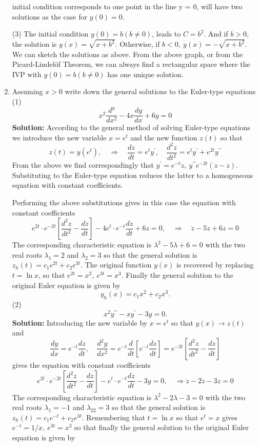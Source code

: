 \documentclass[11pt,a4paper,twoside]{article}
\begin{document}
\begin{enumerate}[\bfseries A.]
\begin{figure}[H]
		\end{figure}
		initial condition corresponds to one point in the line y = 0, will have two solutions as the case for $y(0) = 0$.\par
		(3) The initial condition $y(0) = b(b \neq 0)$, leads to $C=b^2$. And if $b>0$, the solution is $y(x) = \sqrt{x+b^2}$.  Otherwise, if $b<0,\ y(x) = -\sqrt{x+b^2}$. We can sketch the solutions as above. From the above graph, or from the Picard-Lindel\"{o}f Theorem, we can always find a rectangular space where the IVP with $y(0) = b(b \neq 0)$ has one unique solution.
		\item Assuming $x > 0$ write down the general solutions to the Euler-type equations (1)
		$$
		x^2\frac{d^y}{dx^2} - 4x\frac{dy}{dx}+6y = 0
		$$
		\textbf{Solution:} According to the general method of solving Euler-type equations we introduce the new variable $x = e^t$ and the new function $z(t)$ so that
		$$
		z(t) = y(e^t),\quad \Rightarrow \quad \frac{dz}{dt} = e^ty^\prime,\quad \frac{d^2z}{dt^2} = e^ty^\prime + e^{2t}y^{\prime\prime}
		$$
		From the above we find correspondingly that $y^\prime = e^{-t}\dot{z},\ y^{\prime\prime} e^{-2t}(\ddot{z} - \dot{z})$.  Substituting to the Euler-type equation reduces the latter to a homogeneous equation with constant coefficients.\par
		Performing the above substitutions gives in this case the equation with constant coefficients
		$$
		e^{2t}\cdot e^{-2t}\left[\frac{d^2z}{dt^2} - \frac{dz}{dt}\right]-4e^t\cdot e^{-t}\frac{dz}{dt} + 6z = 0,\quad \Rightarrow \quad \ddot{z}-5\dot{z} + 6z = 0
		$$
		The corresponding characteristic equation is $\lambda^2-5\lambda+6=0$ with the two real roots $\lambda_1 = 2$ and $\lambda_2 = 3$ so that the general solution is $z_h(t) = c_1e^{2t} + c_2e^{3t}$. The original function $y(x)$ is recovered by replacing $t = \ln x$, so that $e^{2t} = x^2,\ e^{3t} = x^3$. Finally the general solution to the original Euler equation is given by
		$$
		y_h(x) = c_1x^2 + c_2x^3.
		$$
		(2)
		$$
		x^2y^{\prime\prime} - xy^\prime - 3y = 0.
		$$
		\textbf{Solution:} Introducing the new variable by $x = e^t$ so that $y(x) \to z(t)$ and
		$$
		\frac{dy}{dx} = e^{-t}\frac{dz}{dt},\quad \frac{d^2y}{dx^2}=e^{-t}\frac{d}{dt}\left[e^{-t}\frac{dz}{dt}\right] = e^{-2t}\left[\frac{d^2z}{dt^2} - \frac{dz}{dt}\right]
		$$
		gives the equation with constant coefficients
		$$
		e^{2t}\cdot e^{-2t}\left[\frac{d^2z}{dt^2}-\frac{dz}{dt}\right] - e^t\cdot e^{-t}\frac{dz}{dt} - 3y = 0,\quad \Rightarrow \ddot{z} - 2\dot{z} - 3z = 0
		$$
		The corresponding characteristic equation is $\lambda^2 - 2\lambda - 3 = 0$ with the two real roots $\lambda_1 = −1$ and $\lambda_22 = 3$ so that the general solution is $z_h(t) = c_1e^{-t}+c_2e^{3t}$. Remembering that $t = \ln x$ so that $e^t = x$ gives $e^{-t} = 1/x,\ e^{3t} = x^3$ so that finally the general solution to the original Euler equation is given by

\end{enumerate}
\end{document}
